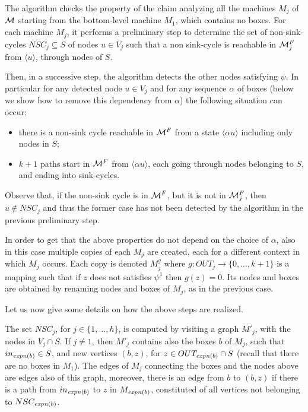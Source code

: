 \documentclass[letterpaper,twocolumn,10pt]{article}
\def    \M          {{\cal M}}
\begin{document}
The algorithm  checks the property of the claim analyzing all the machines $M_j$ of $\M$
starting from the bottom-level machine $M_1$, which  contains no boxes.
For each machine $M_j$, it performs a preliminary step to determine
the set of non-sink-cycles $NSC_j \subseteq S$ of nodes $u \in V_j$ such that   a non sink-cycle
is reachable in $\M_j^F$ from  $\langle  u \rangle $, through nodes of $S$.


Then, in a successive  step, the algorithm detects the other nodes satisfying  $\psi$.
In particular for any detected node $u \in V_j$ and
for any sequence $\alpha$ of boxes (below we show how to remove this dependency from $\alpha$)
the following situation can occur:
 \begin{itemize}
 \item
there is a non-sink cycle reachable in $\M^F$ from a state $\langle \alpha u \rangle $ including only nodes in $S$;
\item
 $k+1$ paths start in $\M^F$
from  $\langle \alpha u \rangle$,  each going through nodes belonging to  $S$, and ending into sink-cycles.
\end{itemize}

Observe that, if the  non-sink cycle is in   $\M^F$, but it is not  in $\M_{j} ^F$, then
 $u \notin  NSC_j$ and thus
 the former case has not been detected by the algorithm in the previous preliminary step.

In order to  get that the above properties do not depend on the choice of
$\alpha$, also in  this case multiple copies of each $M_j$ are created, each for a different
context in which $M_j$ occurs.
Each copy is denoted $M_j^g$ where  $g:OUT_j \rightarrow \{0,\ldots,k+1\}$
is a mapping such that if $z$ does not satisfies $\psi^1$ then $g(z)=0$.
Its nodes and boxes are obtained by renaming  nodes and boxes of
$M_j$, as in the previous case.




Let us now give some details on how the above steps are realized.


The set $NSC_j$, for $j \in \{1,\dots,h\}$,
is computed by visiting a graph
$M'_j$, with the nodes in $V_j \cap S$.
If $j \neq 1$, then $M'_j$ contains also
 the boxes $b$ of $M_j$, such that $in_{\mathit{expn}(b)} \in S$, and
new vertices $(b,z)$, for $z \in OUT_{\mathit{expn}(b)}\cap S$ (recall that there are no boxes in $M_1$). The
edges of $M_j$ connecting the boxes and the nodes above are edges also of this graph,
moreover, there is an edge from $b$ to $(b,z)$ if there is a path from $in_{\mathit{expn}(b)}$ to $z$ in $M_{\mathit{expn}(b)}$,
constituted of all vertices not belonging to $NSC_{\mathit{expn}(b)}$.
\end{document}
